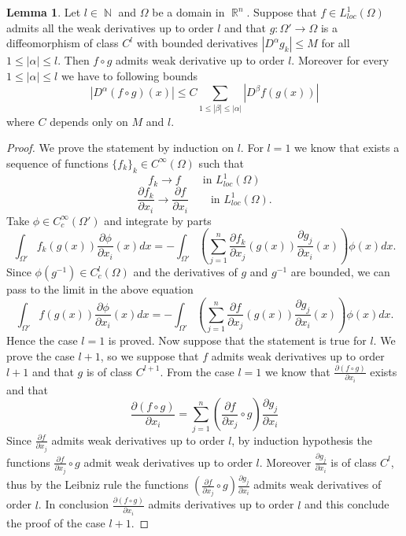 \documentclass[12pt]{article}
\theoremstyle{definition}
\newtheorem{lemma}{Lemma}
\DeclareMathOperator\rr{\mathbb{R}}
\DeclareMathOperator\nn{\mathbb{N}}
\begin{document}
\begin{lemma}\label{composition}
Let $l \in \nn$ and $\Omega$ be a domain in $\rr^n$. Suppose that $f \in L^1_{loc}(\Omega)$ admits all the weak derivatives up to order $l$ and that $g:\Omega'\rightarrow \Omega$ is a diffeomorphism of class $C^l$ with bounded derivatives $|D^\alpha g_k|\le M$ for all $1 \le |\alpha| \le l$. Then $f\circ g$ admits weak derivative up to order $l$. Moreover for every $1\le |\alpha|\le l$ we have to following bounds
\begin{equation} |D^\alpha (f\circ g)(x)|\le C \sum_{1\le|\beta|\le |\alpha|} |D^\beta f(g(x))| \label{compbound}
\end{equation}
where $C$ depends only on $M$ and $l$.
\end{lemma}
\begin{proof}
We prove the statement by induction on $l$. For $l=1$ we know that exists a sequence of functions $\{f_k\}_k  \in C^\infty(\Omega)$ such that
\[ f_k \rightarrow f \qquad \text{in } L^1_{loc}(\Omega) \]
\[ \frac{\partial f_k }{\partial x_i}\rightarrow \frac{\partial f }{\partial x_i} \qquad \text{in } L^1_{loc}(\Omega).\]
Take $\phi \in C^\infty_c(\Omega')$ and integrate by parts
\[\int_{\Omega'} f_k(g(x))\frac{\partial \phi }{\partial x_i}(x)dx = - \int_{\Omega'} \left(\sum_{j=1}^n \frac{\partial f_k }{\partial x_j}(g(x))\frac{\partial g_j }{\partial x_i}(x)\right)\phi(x)dx.\]
Since $\phi(g^{-1}) \in C^l_c(\Omega)$ and the derivatives of $g$ and $g^{-1}$ are bounded, we can pass to the limit in the above equation
\[\int_{\Omega'} f(g(x))\frac{\partial \phi }{\partial x_i}(x)dx = - \int_{\Omega'} \left(\sum_{j=1}^n \frac{\partial f }{\partial x_j}(g(x))\frac{\partial g_j }{\partial x_i}(x)\right)\phi(x)dx.\]
Hence the case $l=1$ is proved. Now suppose that the statement is true for $l$. We prove the case $l+1$, so we suppose that $f$ admits weak derivatives up to order $l+1$ and that $g$ is of class $C^{l+1}$. From the case $l=1$ we know that $\frac{\partial (f \circ g) }{\partial x_i}$ exists and that
\[ \frac{\partial (f \circ g) }{\partial x_i}= \sum_{j=1}^n (\frac{\partial f }{\partial x_j} \circ g)\frac{\partial g_j }{\partial x_i}\] 
Since $\frac{\partial f }{\partial x_j}$ admits weak derivatives up to order $l$, by induction hypothesis the functions $\frac{\partial f }{\partial x_j} \circ g$ admit weak derivatives up to order $l$. Moreover $\frac{\partial g_j }{\partial x_i}$ is of class $C^l$, thus by the Leibniz rule the functions $(\frac{\partial f }{\partial x_j} \circ g)\frac{\partial g_j }{\partial x_i}$ admits weak derivatives of order $l$. In conclusion $\frac{\partial (f \circ g) }{\partial x_i}$ admits derivatives up to order $l$ and this conclude the proof of the case $l+1$. 


\end{proof}
\end{document}
